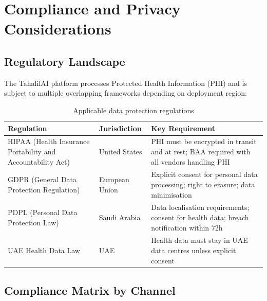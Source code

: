 \documentclass[12pt,a4paper]{article}
\begin{document}
\section{Compliance and Privacy Considerations}

\subsection{Regulatory Landscape}

The TahalilAI platform processes Protected Health Information (PHI) and is
subject to multiple overlapping frameworks depending on deployment region:

\begin{table}[h!]
\centering
\begin{tabularx}{\linewidth}{l X X}
\toprule
\textbf{Regulation} & \textbf{Jurisdiction} & \textbf{Key Requirement} \\
\midrule
\rowcolor{rowA}
HIPAA (Health Insurance Portability and Accountability Act) &
    United States &
    PHI must be encrypted in transit and at rest; BAA required with
    all vendors handling PHI \\
GDPR (General Data Protection Regulation) &
    European Union &
    Explicit consent for personal data processing; right to erasure;
    data minimisation \\
\rowcolor{rowA}
PDPL (Personal Data Protection Law) &
    Saudi Arabia &
    Data localisation requirements; consent for health data;
    breach notification within 72h \\
UAE Health Data Law &
    UAE &
    Health data must stay in UAE data centres unless explicit consent \\
\bottomrule
\end{tabularx}
\caption{Applicable data protection regulations}
\end{table}

\subsection{Compliance Matrix by Channel}
\end{document}
